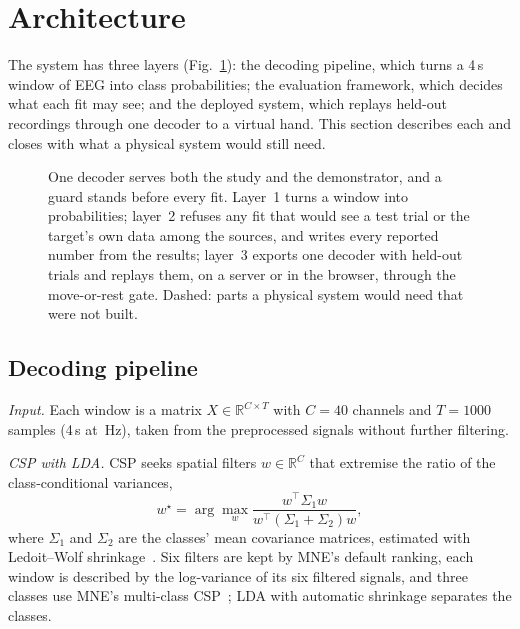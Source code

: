 \section{Architecture}
\label{sec:arch}

The system has three layers (Fig.~\ref{fig:arch}): the decoding pipeline, which turns a 4\,s
window of EEG into class probabilities; the evaluation framework, which decides what each fit
may see; and the deployed system, which replays held-out recordings through one decoder to a
virtual hand. This section describes each and closes with what a physical system would still
need.

\begin{figure}[!t]
  \centering
  
  \caption{One decoder serves both the study and the demonstrator, and a guard stands before
  every fit. Layer~1 turns a window into probabilities; layer~2 refuses any fit that would see a
  test trial or the target's own data among the sources, and writes every reported number from
  the results; layer~3 exports one decoder with held-out trials and replays them, on a server or
  in the browser, through the move-or-rest gate. Dashed: parts a physical system would need that
  were not built.}
  \label{fig:arch}
\end{figure}

\subsection{Decoding pipeline}
\label{sec:pipeline}

\emph{Input.} Each window is a matrix $X \in \mathbb{R}^{C \times T}$ with $C = 40$ channels and
$T = 1000$ samples (4\,s at \nSamplingRate\,Hz), taken from the preprocessed signals without
further filtering.

\emph{CSP with LDA.} CSP seeks spatial filters $w \in \mathbb{R}^{C}$ that extremise the ratio of
the class-conditional variances,
\begin{equation}
w^{\star} = \arg\max_{w} \frac{w^{\top} \Sigma_1 w}{w^{\top} (\Sigma_1 + \Sigma_2) w},
\label{eq:csp}
\end{equation}
where $\Sigma_1$ and $\Sigma_2$ are the classes' mean covariance matrices, estimated with
Ledoit--Wolf shrinkage~\cite{ledoit2004}. Six filters are kept by MNE's default ranking, each
window is described by the log-variance of its six filtered signals, and three classes use MNE's
multi-class CSP~\cite{gramfort2013}; LDA with automatic shrinkage separates the classes.

